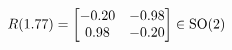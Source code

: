 \documentclass[preview]{standalone}
\begin{document}
\begin{align*}
\special{dvisvgm:raw <g id='unique000'>}R(1.77) = \begin{bmatrix} -0.20 & -0.98 \\ 0.98 & -0.20 \end{bmatrix} \in \text{SO}(2)\special{dvisvgm:raw </g>}
\end{align*}
\end{document}
